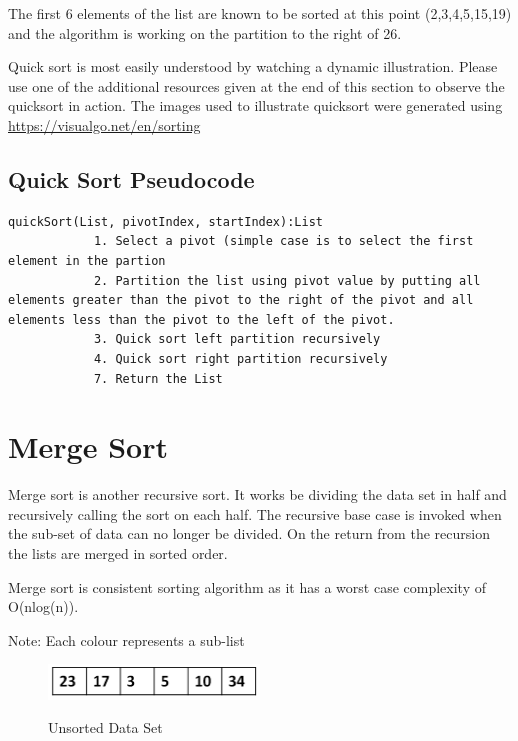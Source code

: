 The first 6 elements of the list are known to be sorted at this point (2,3,4,5,15,19) and the algorithm is working on the partition to the right of 26.


Quick sort is most easily understood by watching a dynamic illustration.  Please use one of the additional resources given at the end of this section to observe the quicksort in action.  The images used to illustrate quicksort were generated using \url{https://visualgo.net/en/sorting}

\subsection{Quick Sort Pseudocode}

\begin{lstlisting}
quickSort(List, pivotIndex, startIndex):List
            1. Select a pivot (simple case is to select the first element in the partion
            2. Partition the list using pivot value by putting all elements greater than the pivot to the right of the pivot and all elements less than the pivot to the left of the pivot.
            3. Quick sort left partition recursively
            4. Quick sort right partition recursively
            7. Return the List
\end{lstlisting}

\section{Merge Sort}

Merge sort is another recursive sort. It works be dividing the data set in half and recursively calling the sort on each half.  The recursive base case is invoked when the sub-set of data  can no longer be divided.  On the return from the recursion the lists are merged in sorted order. 

Merge sort is  consistent sorting algorithm as it has a worst case complexity of O(nlog(n)). 

Note: Each colour represents a sub-list

\begin{figure}[H]
\centering
\includegraphics[width=0.5\textwidth]{pictures/merge1.png}
\label{fig:merge1}
\caption{Unsorted Data Set}
\end{figure}

